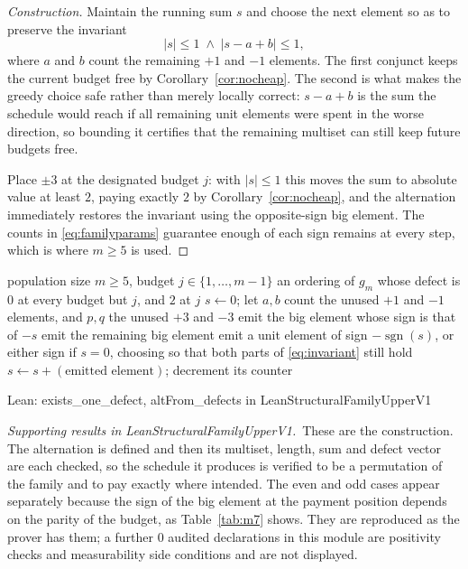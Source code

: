 \documentclass[conference]{IEEEtran}
\theoremstyle{definition}
\newcommand{\lean}[1]{\textsf{\footnotesize #1}}
\newcommand{\leanbox}[1]{%
  \par\vspace{2pt}\noindent
  {\footnotesize\textsf{Lean: #1}}\par\vspace{2pt}}
\begin{document}
\begin{proof}[Construction]
Maintain the running sum $s$ and choose the next element so as to preserve the invariant
\begin{equation}
|s|\le1 \;\wedge\; |s-a+b|\le1,
\label{eq:invariant}
\end{equation}
where $a$ and $b$ count the remaining $+1$ and $-1$ elements. The first conjunct keeps the
current budget free by Corollary~\ref{cor:nocheap}. The second is what makes the greedy
choice safe rather than merely locally correct: $s-a+b$ is the sum the schedule would reach
if all remaining unit elements were spent in the worse direction, so bounding it certifies
that the remaining multiset can still keep future budgets free.

Place $\pm3$ at the designated budget $j$: with $|s|\le1$ this moves the sum to absolute
value at least $2$, paying exactly $2$ by Corollary~\ref{cor:nocheap}, and the alternation
immediately restores the invariant using the opposite-sign big element. The counts in
\eqref{eq:familyparams} guarantee enough of each sign remains at every step, which is where
$m\ge5$ is used.
\end{proof}

\begin{algorithm}[htbp]
\caption{One-defect schedule for a designated budget $j$}
\label{alg:menu}
\begin{algorithmic}[1]
\REQUIRE population size $m\ge5$, budget $j\in\{1,\dots,m-1\}$
\ENSURE an ordering of $g_{m}$ whose defect is $0$ at every budget but $j$, and $2$ at $j$
\STATE $s\leftarrow0$; let $a,b$ count the unused $+1$ and $-1$ elements, and
       $p,q$ the unused $+3$ and $-3$
    \STATE emit the big element whose sign is that of $-s$ 
    \STATE emit the remaining big element 
  \ELSE
    \STATE emit a unit element of sign $-\operatorname{sgn}(s)$, or either sign if $s=0$,
           choosing so that both parts of \eqref{eq:invariant} still hold
  \ENDIF
  \STATE $s\leftarrow s+(\text{emitted element})$; decrement its counter
\ENDFOR
\end{algorithmic}
\end{algorithm}

\leanbox{\lean{exists\_one\_defect}, \lean{altFrom\_defects} in
\lean{LeanStructuralFamilyUpperV1}}

\noindent\emph{Supporting results in \lean{LeanStructuralFamilyUpperV1}.}~These are the construction. The alternation is defined and then its multiset, length, sum and defect vector are each checked, so the schedule it produces is verified to be a permutation of the family and to pay exactly where intended. The even and odd cases appear separately because the sign of the big element at the payment position depends on the parity of the budget, as Table~\ref{tab:m7} shows. They are reproduced as the prover has them; a further $0$ audited declarations in this module are positivity checks and measurability side conditions and are not displayed.
\end{document}
